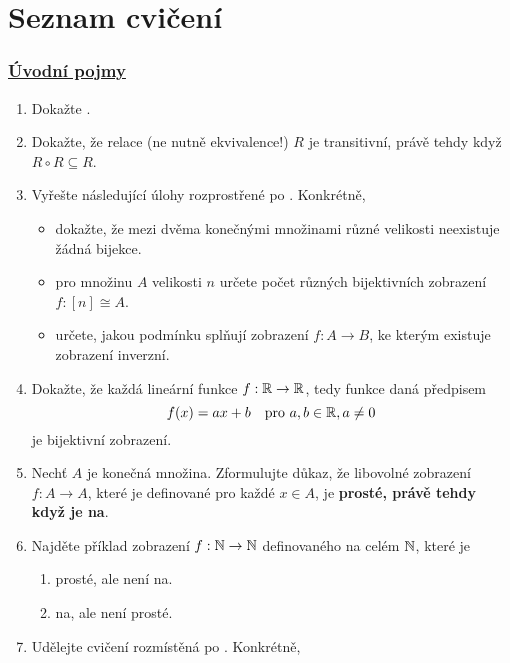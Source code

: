 \section*{Seznam cvičení}
\label{sec:seznam-cviceni}


\subsubsection*{\hyperref[sec:uvodni-pojmy]{Úvodní pojmy}}

\begin{enumerate}
 \item Dokažte .
 \item Dokažte, že relace (ne nutně ekvivalence!) $R$ je transitivní, právě
  tehdy když $R \circ R \subseteq R$.
 \item Vyřešte následující úlohy rozprostřené po .
  Konkrétně,
  \begin{itemize}
   \item dokažte, že mezi dvěma konečnými množinami
   různé velikosti neexistuje žádná bijekce.
   \item pro množinu $A$ velikosti $n$ určete počet různých bijektivních
    zobrazení ${f:[n] \cong A}$. \item určete, jakou podmínku splňují zobrazení
    $f:A \to B$, ke kterým existuje zobrazení inverzní.
  \end{itemize}
 \item Dokažte, že každá lineární funkce $f:\mathbb{R} \to \mathbb{R}$, tedy funkce daná
  předpisem
  \[
   f(x) = ax + b \quad \text{pro } a,b \in \mathbb{R},a \neq 0
  \]
  je bijektivní zobrazení.
 \item Nechť $A$ je konečná množina. Zformulujte důkaz, že libovolné zobrazení
  ${f:A \to A}$, které je definované pro každé $x \in A$, je \textbf{prosté,
  právě tehdy když je na}.
 \item Najděte příklad zobrazení $f:\mathbb{N} \to \mathbb{N}$ definovaného na celém $\mathbb{N}$, které
  je
 \begin{enumerate}
  \item prosté, ale není na.
  \item na, ale není prosté.
 \end{enumerate}
 \item Udělejte cvičení rozmístěná po . Konkrétně,
  \begin{enumerate}

\end{enumerate}
\end{enumerate}
